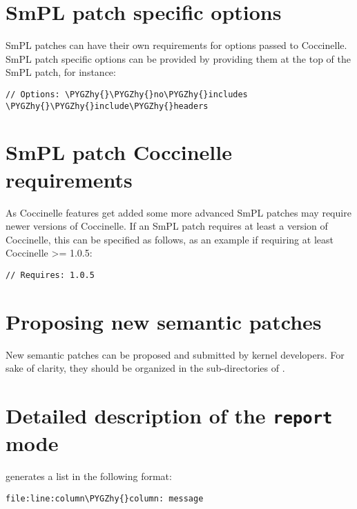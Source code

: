 \documentclass[a4paper,8pt,english]{sphinxmanual}
\def\PYGZhy{\char`\-}
\begin{document}
\section{SmPL patch specific options}
\label{dev-tools/coccinelle:smpl-patch-specific-options}
SmPL patches can have their own requirements for options passed
to Coccinelle. SmPL patch specific options can be provided by
providing them at the top of the SmPL patch, for instance:

\begin{Verbatim}[commandchars=\\\{\}]
// Options: \PYGZhy{}\PYGZhy{}no\PYGZhy{}includes \PYGZhy{}\PYGZhy{}include\PYGZhy{}headers
\end{Verbatim}


\section{SmPL patch Coccinelle requirements}
\label{dev-tools/coccinelle:smpl-patch-coccinelle-requirements}
As Coccinelle features get added some more advanced SmPL patches
may require newer versions of Coccinelle. If an SmPL patch requires
at least a version of Coccinelle, this can be specified as follows,
as an example if requiring at least Coccinelle \textgreater{}= 1.0.5:

\begin{Verbatim}[commandchars=\\\{\}]
// Requires: 1.0.5
\end{Verbatim}


\section{Proposing new semantic patches}
\label{dev-tools/coccinelle:proposing-new-semantic-patches}
New semantic patches can be proposed and submitted by kernel
developers. For sake of clarity, they should be organized in the
sub-directories of .


\section{Detailed description of the \texttt{report} mode}
\label{dev-tools/coccinelle:detailed-description-of-the-report-mode}
 generates a list in the following format:

\begin{Verbatim}[commandchars=\\\{\}]
file:line:column\PYGZhy{}column: message
\end{Verbatim}
\end{document}
